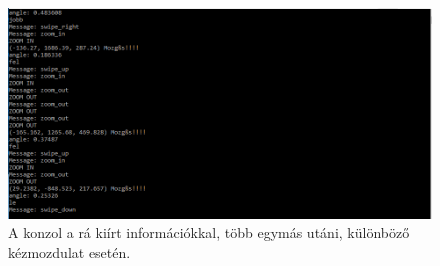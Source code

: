 
\begin{figure}[!ht]
	\includegraphics[width=150mm,keepaspectratio]{figures/m10/4.png}
	\caption{A konzol a rá kiírt információkkal, több egymás utáni, különböző kézmozdulat esetén.}
\end{figure}



























